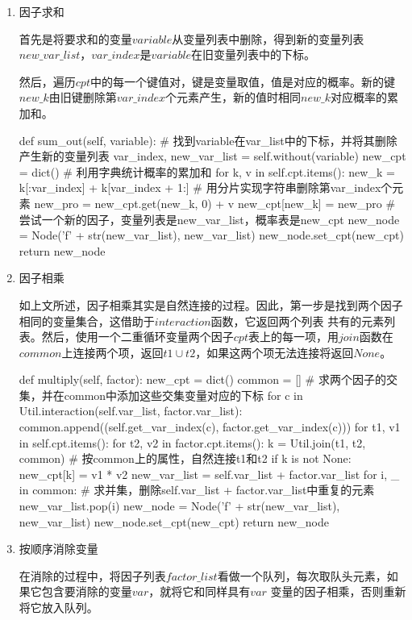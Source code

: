 \documentclass[10pt,letterpaper]{ctexart}
\begin{document}
\begin{enumerate}[itemindent=2em,label=\arabic*、]
  \item 因子求和
  \par \qquad 首先是将要求和的变量$variable$从变量列表中删除，得到新的变量列表$new\_var\_list$，$var\_index$是$variable$在旧变量列表中的下标。
  \par \qquad 然后，遍历$cpt$中的每一个键值对，键是变量取值，值是对应的概率。新的键$new\_k$由旧键删除第$var\_index$个元素产生，新的值时相同$new\_k$对应概率的累加和。
  \begin{python}
def sum_out(self, variable):
  # 找到variable在var_list中的下标，并将其删除产生新的变量列表
  var_index, new_var_list = self.without(variable)
  new_cpt = dict()    # 利用字典统计概率的累加和
  for k, v in self.cpt.items():
    new_k = k[:var_index] + k[var_index + 1:]   # 用分片实现字符串删除第var_index个元素
    new_pro = new_cpt.get(new_k, 0) + v
    new_cpt[new_k] = new_pro
  # 尝试一个新的因子，变量列表是new_var_list，概率表是new_cpt
  new_node = Node('f' + str(new_var_list), new_var_list)
  new_node.set_cpt(new_cpt)
  return new_node
  \end{python}

  \newpage
  \item 因子相乘
  \par \qquad 如上文所述，因子相乘其实是自然连接的过程。因此，第一步是找到两个因子相同的变量集合，这借助于$interaction$函数，它返回两个列表
  共有的元素列表。然后，使用一个二重循环变量两个因子$cpt$表上的每一项，用$join$函数在$common$上连接两个项，返回$t1 \cup t2$，如果这两个项无法连接将返回$None$。
  \begin{python}
def multiply(self, factor):
  new_cpt = dict()
  common = []
  # 求两个因子的交集，并在common中添加这些交集变量对应的下标
  for c in Util.interaction(self.var_list, factor.var_list):
    common.append((self.get_var_index(c), factor.get_var_index(c)))
  for t1, v1 in self.cpt.items():
    for t2, v2 in factor.cpt.items():
      k = Util.join(t1, t2, common) # 按common上的属性，自然连接t1和t2
      if k is not None:
        new_cpt[k] = v1 * v2
  new_var_list = self.var_list + factor.var_list
  for i, _ in common:   # 求并集，删除self.var_list + factor.var_list中重复的元素
    new_var_list.pop(i)
  new_node = Node('f' + str(new_var_list), new_var_list)
  new_node.set_cpt(new_cpt)
  return new_node
  \end{python}

  \item 按顺序消除变量
  \par \qquad 在消除的过程中，将因子列表$factor\_list$看做一个队列，每次取队头元素，如果它包含要消除的变量$var$，就将它和同样具有$var$
  变量的因子相乘，否则重新将它放入队列。


\end{enumerate}
\end{document}
